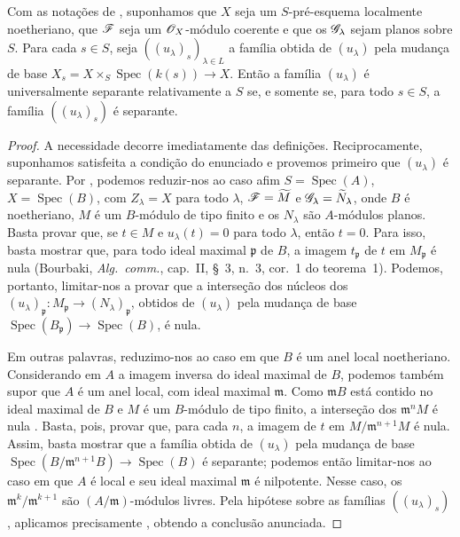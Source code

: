 \begin{theorem}[11.9.16]
\label{IV.11.9.16}
Com as notações de
,
suponhamos que $X$
seja um $S$-pré-esquema
localmente noetheriano,
que $\mathscr{F}$ seja um
$\mathscr{O}_X$-módulo
coerente e que os
$\mathscr{G}_\lambda$
sejam planos sobre
$S$. Para cada
$s\in S$, seja
$((u_\lambda)_s)
_{\lambda\in L}$
a família obtida de
$(u_\lambda)$ pela
mudança de base
$X_s=X\times_S
\operatorname{Spec}(k(s))
\to X$. Então a
família $(u_\lambda)$
é universalmente
separante relativamente
a $S$ se, e somente
se, para todo $s\in S$,
a família
$((u_\lambda)_s)$
é separante.
\end{theorem}

\begin{proof}
A necessidade decorre
imediatamente das
definições.
Reciprocamente,
suponhamos satisfeita
a condição do
enunciado e provemos
primeiro que
$(u_\lambda)$ é
separante. Por
,
podemos reduzir-nos
ao caso afim
$S=\operatorname{Spec}(A)$,
$X=\operatorname{Spec}(B)$,
com $Z_\lambda=X$
para todo $\lambda$,
$\mathscr{F}=\widetilde M$
e
$\mathscr{G}_\lambda=
\widetilde N_\lambda$,
onde $B$ é
noetheriano, $M$ é
um $B$-módulo de
tipo finito e os
$N_\lambda$ são
$A$-módulos planos.
Basta provar que,
se $t\in M$ e
$u_\lambda(t)=0$
para todo $\lambda$,
então $t=0$.
Para isso, basta
mostrar que, para
todo ideal maximal
$\mathfrak p$ de $B$,
a imagem
$t_\mathfrak p$
de $t$ em
$M_\mathfrak p$
é nula (Bourbaki,
\emph{Alg.\ comm.},
cap.~II, \S~3,
n.~3, cor.~1 do
teorema~1).
Podemos, portanto,
limitar-nos a provar
que a interseção
dos núcleos dos
$(u_\lambda)_\mathfrak p:
M_\mathfrak p\to
(N_\lambda)_\mathfrak p$,
obtidos de
$(u_\lambda)$ pela
mudança de base
$\operatorname{Spec}
(B_\mathfrak p)
\to\operatorname{Spec}(B)$,
é nula.

Em outras palavras,
reduzimo-nos ao caso
em que $B$ é um
anel local noetheriano.
Considerando em $A$
a imagem inversa do
ideal maximal de
$B$, podemos também
supor que $A$ é
um anel local, com
ideal maximal
$\mathfrak m$.
Como $\mathfrak mB$
está contido no
ideal maximal de
$B$ e $M$ é um
$B$-módulo de tipo
finito, a interseção
dos
$\mathfrak m^nM$
é nula
.
Basta, pois, provar
que, para cada $n$,
a imagem de $t$
em
$M/\mathfrak m^{n+1}M$
é nula. Assim,
basta mostrar que
a família obtida
de $(u_\lambda)$
pela mudança de base
$\operatorname{Spec}
(B/\mathfrak m^{n+1}B)
\to\operatorname{Spec}(B)$
é separante; podemos
então limitar-nos
ao caso em que $A$
é local e seu ideal
maximal $\mathfrak m$
é nilpotente. Nesse
caso, os
$\mathfrak m^k/
\mathfrak m^{k+1}$
são
$(A/\mathfrak m)$-módulos
livres. Pela hipótese
sobre as famílias
$((u_\lambda)_s)$,
aplicamos precisamente
,
obtendo a conclusão
anunciada.


\end{proof}
